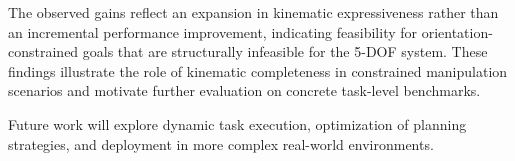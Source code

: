 \documentclass[conference]{IEEEtran}
\begin{document}
	The observed gains reflect an expansion in kinematic expressiveness
	rather than an incremental performance improvement, indicating
	feasibility for orientation-constrained goals that are structurally
	infeasible for the 5-DOF system. These findings illustrate the role
	of kinematic completeness in constrained manipulation scenarios and
	motivate further evaluation on concrete task-level benchmarks.
	
	Future work will explore dynamic task execution, optimization of
	planning strategies, and deployment in more complex real-world
	environments.
	
	
	
	
	
\end{document}
